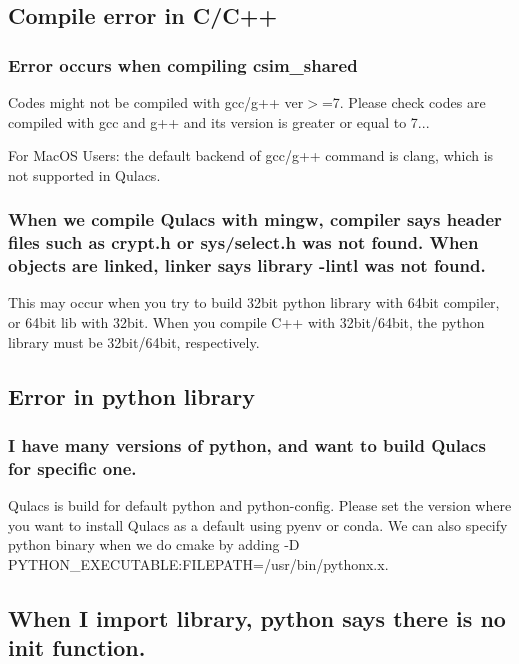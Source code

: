 \subsection*{Compile error in C/\+C++}

\subsubsection*{Error occurs when compiling csim\+\_\+shared}

Codes might not be compiled with gcc/g++ ver$>$=7. Please check codes are compiled with gcc and g++ and it\textquotesingle{}s version is greater or equal to 7...

For Mac\+OS Users\+: the default backend of gcc/g++ command is clang, which is not supported in Qulacs.

\subsubsection*{When we compile Qulacs with mingw, compiler says header files such as crypt.\+h or sys/select.\+h was not found. When objects are linked, linker says library -\/lintl was not found.}

This may occur when you try to build 32bit python library with 64bit compiler, or 64bit lib with 32bit. When you compile C++ with 32bit/64bit, the python library must be 32bit/64bit, respectively.

\subsection*{Error in python library}

\subsubsection*{I have many versions of python, and want to build Qulacs for specific one.}

Qulacs is build for default python and python-\/config. Please set the version where you want to install Qulacs as a default using pyenv or conda. We can also specify python binary when we do cmake by adding -\/D P\+Y\+T\+H\+O\+N\+\_\+\+E\+X\+E\+C\+U\+T\+A\+B\+LE\+:F\+I\+L\+E\+P\+A\+TH=/usr/bin/pythonx.x.

\subsection*{When I import library, python says there is no init function.}

